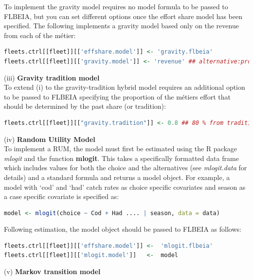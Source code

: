 \documentclass[12pt, halfline, a4paper]{ouparticle}
\begin{document}
To implement the gravity model requires no model formula to be passed to
FLBEIA, but you can set different options once the effort share model has been
specified. The following implements a gravity model based only on the revenue
from each of the métier:

\begin{lstlisting}[language=R]
fleets.ctrl[[fleet]][['effshare.model']] <- 'gravity.flbeia'
fleets.ctrl[[fleet]][['gravity.model']] <- 'revenue' ## alternative:profit 
\end{lstlisting}

(iii) \textbf{Gravity tradition model} \\

To extend (i) to the gravity-tradition hybrid model requires an additional
option to be passed to FLBEIA specifying the proportion of the métiers effort
that should be determined by the past share (or tradition):

\begin{lstlisting}[language=R]
fleets.ctrl[[fleet]][["gravity.tradition"]] <- 0.8 ## 80 % from tradition
\end{lstlisting}

(iv) \textbf{Random Utility Model} \\

To implement a RUM, the model must first be estimated using the R package
\textit{mlogit} \citep{Croissant2019} and the function \textbf{mlogit}. This
takes a specifically formatted data frame which includes values for both the
choice and the alternatives (see \textit{mlogit.data} for details) and a
standard formula and returns a model object. For example, a model with `cod'
and `had' catch rates as choice specific covariates and season as a case
specific covariate is specified as:

\begin{lstlisting}[language=R]
model <- mlogit(choice ~ Cod + Had .... | season, data = data)
\end{lstlisting}


Following estimation, the model object should be passed to FLBEIA as follows:

\begin{lstlisting}[language=R]
fleets.ctrl[[fleet]][['effshare.model']] <-  'mlogit.flbeia'
fleets.ctrl[[fleet]][['mlogit.model']]   <-  model 
\end{lstlisting}

(v) \textbf{Markov transition model} \\
\end{document}
